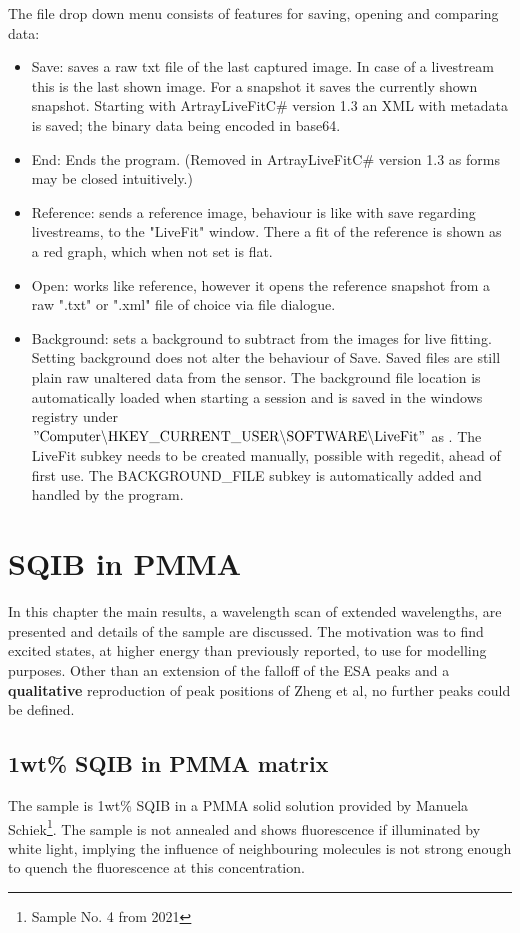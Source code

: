 \documentclass[twoside,openright,listof=numbered]{scrreprt}
\begin{document}
The file drop down menu consists of features for saving, opening and comparing data:
\begin{itemize}
\item Save: saves a raw txt file of the last captured image. In case of a livestream this is the last shown image. For a snapshot it saves the currently shown snapshot. Starting with ArtrayLiveFitC\# version 1.3 an XML with metadata is saved; the binary data being encoded in base64.
\item End: Ends the program. (Removed in ArtrayLiveFitC\# version 1.3 as forms may be closed intuitively.)
\item Reference: sends a reference image, behaviour is like with save regarding livestreams, to the "LiveFit" window. There a fit of the reference is shown as a red graph, which when not set is flat.
\item Open: works like reference, however it opens the reference snapshot from a raw ".txt" or ".xml" file of choice via file dialogue.
\item Background: sets a background to subtract from the images for live fitting. Setting background does not alter the behaviour of Save. Saved files are still plain raw unaltered data from the sensor. The background file location is automatically loaded when starting a session and is saved in the windows registry under $\mathrm{"Computer \backslash HKEY\_CURRENT\_USER \backslash SOFTWARE \backslash LiveFit"}$ as . The LiveFit subkey needs to be created manually, possible with regedit, ahead of first use. The BACKGROUND\_FILE subkey is automatically added and handled by the program.
\end{itemize}


\chapter{SQIB in PMMA}\label{chpt:results}
In this chapter the main results, a wavelength scan of extended wavelengths, are presented and details of the sample are discussed. The motivation was to find excited states, at higher energy than previously reported, to use for modelling purposes. Other than an extension of the falloff of the ESA peaks and a \textbf{qualitative} reproduction of peak positions of Zheng et al\cite{Zheng2020}, no further peaks could be defined.

\section{1wt\% SQIB in PMMA matrix}
The sample is 1wt\% SQIB in a PMMA solid solution provided by Manuela Schiek\footnote{Sample No. 4 from 2021}. The sample is not annealed and shows fluorescence if illuminated by white light, implying the influence of neighbouring molecules is not strong enough to quench the fluorescence at this concentration. \\
\end{document}
